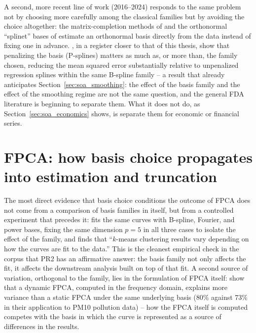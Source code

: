 A second, more recent line of work (2016--2024) responds to the same
problem not by choosing more carefully among the classical families but
by avoiding the choice altogether: the matrix-completion methods of
\cite{descary_matrix_2016,descary_matrix_2019} and the orthonormal
``splinet'' bases of
\cite{nassar_empirically_2021,podgorski_splinets_2021,basna_spline_2024}
estimate an orthonormal basis directly from the data instead of fixing
one in advance. \cite{aguilera_comparative_2013}, in a register closer
to that of this thesis, show that penalizing the basis (P-splines)
matters as much as, or more than, the family chosen, reducing the mean
squared error substantially relative to unpenalized regression splines
within the same B-spline family -- a result that already anticipates
Section~\ref{sec:soa_smoothing}: the effect of the basis family and the
effect of the smoothing regime are not the same question, and the
general FDA literature is beginning to separate them. What it does not
do, as Section~\ref{sec:soa_economics} shows, is separate them for
economic or financial series.

\section{FPCA: how basis choice propagates into estimation and
truncation}
\label{sec:soa_fpca}

The most direct evidence that basis choice conditions the outcome of
FPCA does not come from a comparison of basis families in itself, but
from a controlled experiment that precedes it: \cite{tarpey_linear_2007}
fits the same curves with B-spline, Fourier, and power bases, fixing the
same dimension $p=5$ in all three cases to isolate the effect of the
family, and finds that ``$k$-means clustering results vary depending on
how the curves are fit to the data.'' This is the cleanest empirical
check in the corpus that PR2 has an affirmative answer: the basis family
not only affects the fit, it affects the downstream analysis built on
top of that fit. A second source of variation, orthogonal to the family,
lies in the formulation of FPCA itself: \cite{hormann_dynamic_2012} show
that a dynamic FPCA, computed in the frequency domain, explains more
variance than a static FPCA under the same underlying basis (80\% against
73\% in their application to PM10 pollution data) -- how the FPCA itself
is computed competes with the basis in which the curve is represented as
a source of differences in the results.


